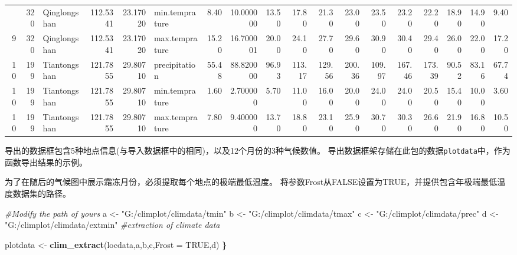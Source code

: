 \documentclass[
]{ctexart}
\newenvironment{Shaded}{\begin{snugshade}}{\end{snugshade}}
\newcommand{\AttributeTok}[1]{\textcolor[rgb]{0.13,0.29,0.53}{#1}}
\newcommand{\CommentTok}[1]{\textcolor[rgb]{0.56,0.35,0.01}{\textit{#1}}}
\newcommand{\ConstantTok}[1]{\textcolor[rgb]{0.56,0.35,0.01}{#1}}
\newcommand{\ErrorTok}[1]{\textcolor[rgb]{0.64,0.00,0.00}{\textbf{#1}}}
\newcommand{\FunctionTok}[1]{\textcolor[rgb]{0.13,0.29,0.53}{\textbf{#1}}}
\newcommand{\NormalTok}[1]{#1}
\newcommand{\OtherTok}[1]{\textcolor[rgb]{0.56,0.35,0.01}{#1}}
\newcommand{\StringTok}[1]{\textcolor[rgb]{0.31,0.60,0.02}{#1}}
\begin{document}
\begin{table}
{\begin{tabular}{rrlrrlrrrrrrrrrrrr}
\addlinespace
9 & 320 & Qinglongshan & 112.5341 & 23.17020 & min.temprature & 8.40 & 10.000000 & 13.50 & 17.80 & 21.30 & 23.00 & 23.50 & 23.20 & 22.20 & 18.90 & 14.90 & 9.40\\
9 & 320 & Qinglongshan & 112.5341 & 23.17020 & max.temprature & 15.20 & 16.700001 & 20.00 & 24.10 & 27.70 & 29.60 & 30.90 & 30.40 & 29.40 & 26.00 & 22.00 & 17.20\\
10 & 199 & Tiantongshan & 121.7855 & 29.80710 & precipitation & 55.48 & 88.820000 & 96.93 & 113.17 & 129.56 & 200.36 & 109.97 & 167.46 & 173.39 & 90.52 & 83.16 & 67.74\\
10 & 199 & Tiantongshan & 121.7855 & 29.80710 & min.temprature & 1.60 & 2.700000 & 5.70 & 11.00 & 16.00 & 20.00 & 24.00 & 24.00 & 20.50 & 15.40 & 10.00 & 3.60\\
10 & 199 & Tiantongshan & 121.7855 & 29.80710 & max.temprature & 7.80 & 9.400000 & 13.70 & 18.80 & 23.10 & 25.90 & 30.70 & 30.30 & 26.60 & 21.90 & 16.80 & 10.50\\
\bottomrule
\end{tabular}}
\end{table}

导出的数据框包含5种地点信息(与导入数据框中的相同)，以及12个月份的3种气候数值。
导出数据框架存储在此包的数据\texttt{plotdata}中，作为函数导出结果的示例。

为了在随后的气候图中展示霜冻月份，必须提取每个地点的极端最低温度。
将参数Frost从FALSE设置为TRUE，并提供包含年极端最低温度数据集的路径。

\begin{Shaded}
\begin{Highlighting}[]
\CommentTok{\#Modify the path of yours}
\NormalTok{a }\OtherTok{\textless{}{-}} \StringTok{"G:/climplot/climdata/tmin"}
\NormalTok{b }\OtherTok{\textless{}{-}} \StringTok{"G:/climplot/climdata/tmax"}
\NormalTok{c }\OtherTok{\textless{}{-}} \StringTok{"G:/climplot/climdata/prec"}
\NormalTok{d }\OtherTok{\textless{}{-}} \StringTok{"G:/climplot/climdata/extmin"}
\CommentTok{\#extraction of climate data}

\NormalTok{plotdata }\OtherTok{\textless{}{-}} \FunctionTok{clim\_extract}\NormalTok{(locdata,a,b,c,}\AttributeTok{Frost =} \ConstantTok{TRUE}\NormalTok{,d)}
\ErrorTok{\}}
\end{Highlighting}
\end{Shaded}
\end{document}
